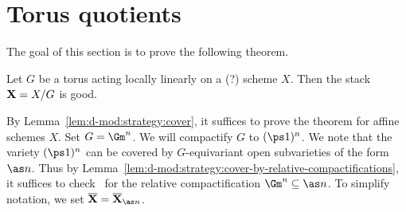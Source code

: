 \chapter{Torus quotients}
\label{ch:d-mod:torus}

The goal of this section is to prove the following theorem.

\begin{Thm}
    \label{thm:d-mod:torus:is-good}%
    Let $G$ be a torus acting locally linearly on a (?) scheme $X$.
    Then the stack $\mathbf X = X/G$ is good.
\end{Thm}

By Lemma~\ref{lem:d-mod:strategy:cover}, it suffices to prove the theorem for affine schemes $X$.
Set $G = \Gm^n$.
We will compactify $G$ to $(\ps1)^n$.
We note that the variety $(\ps1)^n$ can be covered by $G$-equivariant open subvarieties of the form $\as n$.
Thus by Lemma~\ref{lem:d-mod:strategy:cover-by-relative-compactifications}, it suffices to check \goodness\ for the relative compactification $\Gm^n \subseteq \as n$.
To simplify notation, we set $\bar{\stack X} = \bar{\stack X}_{\as n}$.

